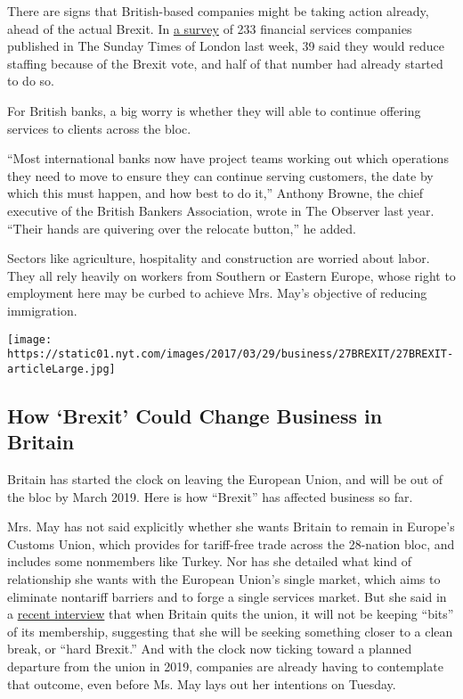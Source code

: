 There are signs that British-based companies might be taking action
already, ahead of the actual Brexit. In
\href{http://www.thetimes.co.uk/article/banks-and-insurers-begin-to-move-workers-after-eu-vote-gnrtfqgzs}{a
survey} of 233 financial services companies published in The Sunday
Times of London last week, 39 said they would reduce staffing because of
the Brexit vote, and half of that number had already started to do so.

For British banks, a big worry is whether they will able to continue
offering services to clients across the bloc.

``Most international banks now have project teams working out which
operations they need to move to ensure they can continue serving
customers, the date by which this must happen, and how best to do it,''
Anthony Browne, the chief executive of the British Bankers Association,
wrote in The Observer last year. ``Their hands are quivering over the
relocate button,'' he added.

Sectors like agriculture, hospitality and construction are worried about
labor. They all rely heavily on workers from Southern or Eastern Europe,
whose right to employment here may be curbed to achieve Mrs. May's
objective of reducing immigration.

\href{https://www.nytimes.com/interactive/2016/business/international/brexit-uk-what-happens-business.html}{}

\texttt{[image: https://static01.nyt.com/images/2017/03/29/business/27BREXIT/27BREXIT-articleLarge.jpg]}

\hypertarget{how-brexit-could-change-business-in-britain}{%
\subsection{How `Brexit' Could Change Business in
Britain}\label{how-brexit-could-change-business-in-britain}}

Britain has started the clock on leaving the European Union, and will be
out of the bloc by March 2019. Here is how ``Brexit'' has affected
business so far.

Mrs. May has not said explicitly whether she wants Britain to remain in
Europe's Customs Union, which provides for tariff-free trade across the
28-nation bloc, and includes some nonmembers like Turkey. Nor has she
detailed what kind of relationship she wants with the European Union's
single market, which aims to eliminate nontariff barriers and to forge a
single services market. But she said in a
\href{http://www.bbc.co.uk/news/uk-politics-38546820}{recent interview}
that when Britain quits the union, it will not be keeping ``bits'' of
its membership, suggesting that she will be seeking something closer to
a clean break, or ``hard Brexit.'' And with the clock now ticking toward
a planned departure from the union in 2019, companies are already having
to contemplate that outcome, even before Ms. May lays out her intentions
on Tuesday.

